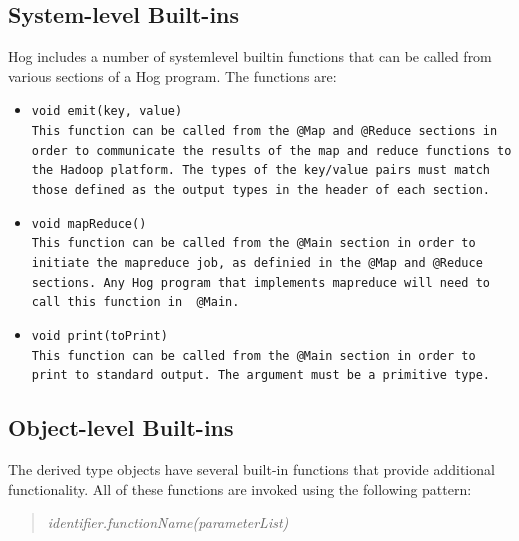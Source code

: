 \documentclass{report}
\begin{document}
\subsection{System-level Built-ins} %
\label{sub:system_level_built_ins}

Hog includes a number of system­level built­in functions that can be called from
various sections of a Hog program. The functions are:

\begin{itemize} 

\item[] \tt void emit(key, value) \rm \\

This function can be called from the \tt @Map \rm and \tt @Reduce \rm sections in
order to communicate the results of the map and reduce functions to the Hadoop
platform. The types of the key/value pairs must match those defined as the output
types in the header of each section.

\item[] \tt void mapReduce() \rm \\

This function can be called from the \tt @Main \rm section in order to initiate
the mapreduce job, as definied in the \tt @Map \rm and \tt @Reduce \rm sections.
Any Hog program that implements mapreduce will need to call this function in \tt
@Main\rm.

\item[] \tt void print(toPrint) \rm \\

This function can be called from the \tt @Main \rm section in order to print to
standard output. The argument must be a primitive type.

\end{itemize}


\subsection{Object-level Built-ins} %
\label{sub:object_level_built_ins}

The derived type objects have several built-in functions that provide
additional functionality. All of these functions are invoked using the
following pattern:

\begin{quotation}
\emph{identifier.functionName(parameterList)}
\end{quotation}
\end{document}
